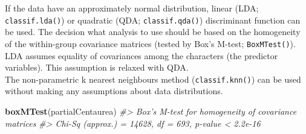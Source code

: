 \documentclass[
]{article}
\newenvironment{Shaded}{\begin{snugshade}}{\end{snugshade}}
\newcommand{\CommentTok}[1]{\textcolor[rgb]{0.56,0.35,0.01}{\textit{#1}}}
\newcommand{\DecValTok}[1]{\textcolor[rgb]{0.00,0.00,0.81}{#1}}
\newcommand{\FloatTok}[1]{\textcolor[rgb]{0.00,0.00,0.81}{#1}}
\newcommand{\KeywordTok}[1]{\textcolor[rgb]{0.13,0.29,0.53}{\textbf{#1}}}
\newcommand{\NormalTok}[1]{#1}
\newcommand{\OperatorTok}[1]{\textcolor[rgb]{0.81,0.36,0.00}{\textbf{#1}}}
\newcommand{\StringTok}[1]{\textcolor[rgb]{0.31,0.60,0.02}{#1}}
\begin{document}
\begin{Shaded}
\end{Shaded}

If the data have an approximately normal distribution, linear (LDA;
\texttt{classif.lda()}) or quadratic (QDA; \texttt{classif.qda()})
discriminant function can be used. The decision what analysis to use
should be based on the homogeneity of the within-group covariance
matrices (tested by Box's M-test; \texttt{BoxMTest()}). LDA assumes
equality of covariances among the characters (the predictor variables).
This assumption is relaxed with QDA.\\
The non-parametric k nearest neighbours method (\texttt{classif.knn()})
can be used without making any assumptions about data distributions.

\begin{Shaded}
\begin{Highlighting}[]
\KeywordTok{boxMTest}\NormalTok{(partialCentaurea)}
\CommentTok{#> Box's M-test for homogeneity of covariance matrices}
\CommentTok{#>  Chi-Sq (approx.) = 14628, df = 693, p-value < 2.2e-16}
\end{Highlighting}
\end{Shaded}
\end{document}
